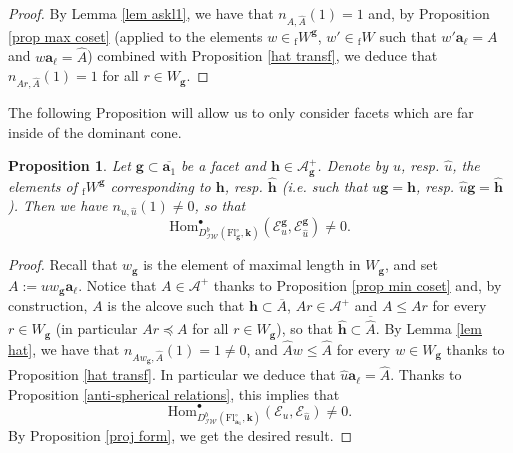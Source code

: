 \documentclass[11pt]{amsart}
\theoremstyle{plain}
\newtheorem{prop}[thm]{Proposition}
\theoremstyle{remark}
\numberwithin{equation}{section}
\begin{document}
	\begin{proof}
		
		By Lemma \ref{lem askl1}, we have that $n_{A,\hat{A}}(1)=1$ and, by Proposition \ref{prop max coset} (applied to the elements $w\in {_\mathrm{f}W}^\mathbf{g}$, $w'\in {_\mathrm{f}W}$ such that $w'\mathbf{a}_\ell=A$ and $w\mathbf{a}_\ell=\hat{A}$) combined with Proposition \ref{hat transf}, we deduce that $n_{Ar,\hat{A}}(1)=1$ for all $r\in W_\mathbf{g}$.
	\end{proof}
	The following Proposition will allow us to only consider facets which are far inside of the dominant cone.
	\begin{prop}\label{away}
		Let $\mathbf{g}\subset \overline{\mathbf{a}_1}$ be a facet  and $\mathbf{h}\in\mathcal{A}^+_\mathbf{g}$. Denote by $u$, resp. $\hat{u}$, the elements of ${_\mathrm{f}W}^\mathbf{g}$ corresponding to $\mathbf{h}$, resp. $\hat{\mathbf{h}}$ (i.e. such that $u\mathbf{g}=\mathbf{h}$, resp. $\hat{u}\mathbf{g}=\hat{\mathbf{h}}$). Then we have $n_{u,\hat{u}}(1)\neq 0$, so that
		$$\mathrm{Hom}_{D^b_{\mathcal{IW}}(\mathrm{Fl}^{\circ}_{\mathbf{g}},\mathbf{k})}^\bullet(\mathcal{E}_{u}^{\mathbf{g}},\mathcal{E}_{\hat{u}}^{\mathbf{g}})\neq 0.$$
	\end{prop}
	\begin{proof}
		
		Recall that $w_\mathbf{g}$ is the element of maximal length in $W_\mathbf{g}$, and set $A:=uw_\mathbf{g}\mathbf{a}_\ell$. Notice that $A\in\mathcal{A}^+$ thanks to Proposition \ref{prop min coset} and, by construction, $A$ is the alcove such that $\mathbf{h}\subset \overline{A}$, $Ar\in\mathcal{A}^+$ and $A\leq Ar$ for every $r\in W_\mathbf{g}$ (in particular $Ar\preceq A$ for all $r\in W_\mathbf{g}$), so that $\hat{\mathbf{h}}\subset\overline{\hat{A}}$. By Lemma \ref{lem hat}, we have that $n_{Aw_\mathbf{g},\hat{A}}(1)=1\neq 0$, and $\hat{A}w\leq \hat{A}$ for every $w\in W_\mathbf{g}$ thanks to Proposition \ref{hat transf}. In particular we deduce that $\hat{u}\mathbf{a}_\ell=\hat{A}$. Thanks to Proposition \ref{anti-spherical relations}, this implies that $$\mathrm{Hom}_{D^b_{\mathcal{IW}}(\mathrm{Fl}^{\circ}_{\mathbf{a}_1},\mathbf{k})}^\bullet(\mathcal{E}_{u},\mathcal{E}_{\hat{u}})\neq 0.$$  
		By Proposition \ref{proj form}, we get the desired result.
	\end{proof}
	
\end{document}
